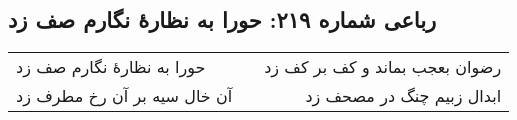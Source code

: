 \begin{center}
\section*{رباعی شماره ۲۱۹: حورا به نظارهٔ نگارم صف زد}
\label{sec:sh219}
\begin{longtable}{l p{0.5cm} r}
حورا به نظارهٔ نگارم صف زد
&&
رضوان بعجب بماند و کف بر کف زد
\\
آن خال سیه بر آن رخ مطرف زد
&&
ابدال زبیم چنگ در مصحف زد
\\
\end{longtable}
\end{center}
